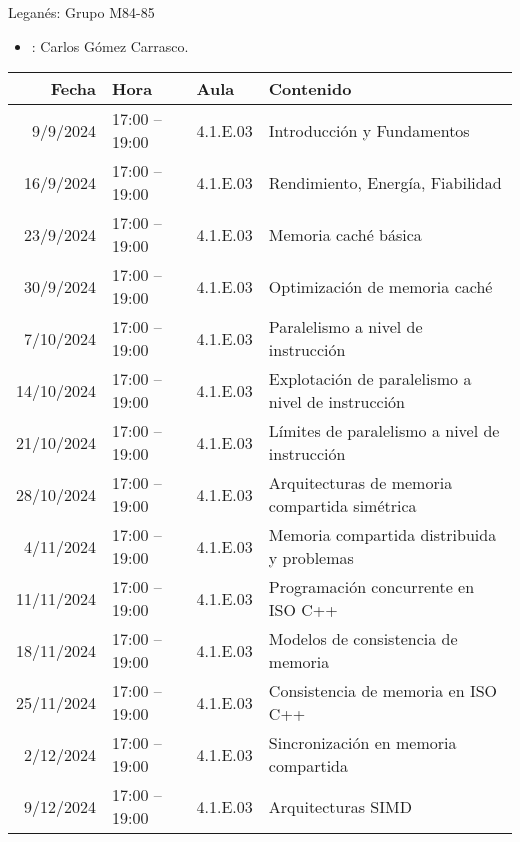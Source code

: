\begin{frame}[t,plain,shrink=20]{Leganés: Grupo M84-85}
\begin{itemize}
  \item {}: Carlos Gómez Carrasco.
\end{itemize}
\vspace{2em}
\begin{tabular}{|r|l|l|l|}
\hline
Fecha & Hora & Aula & Contenido\\
\hline\hline

9/9/2024 & 17:00 -- 19:00 & 4.1.E.03 & Introducción y Fundamentos\\
\hline
16/9/2024 & 17:00 -- 19:00 & 4.1.E.03 & Rendimiento, Energía, Fiabilidad\\
\hline
23/9/2024 & 17:00 -- 19:00 & 4.1.E.03 & Memoria caché básica\\
\hline
30/9/2024 & 17:00 -- 19:00 & 4.1.E.03 & Optimización de memoria caché\\
\hline
7/10/2024 & 17:00 -- 19:00 & 4.1.E.03 & Paralelismo a nivel de instrucción\\
\hline
14/10/2024 & 17:00 -- 19:00 & 4.1.E.03 & Explotación de paralelismo a nivel de instrucción\\
\hline
21/10/2024 & 17:00 -- 19:00 & 4.1.E.03 & Límites de paralelismo a nivel de instrucción\\
\hline
28/10/2024 & 17:00 -- 19:00 & 4.1.E.03 & Arquitecturas de memoria compartida simétrica\\
\hline
4/11/2024 & 17:00 -- 19:00 & 4.1.E.03 & Memoria compartida distribuida y problemas\\
\hline
11/11/2024 & 17:00 -- 19:00 & 4.1.E.03 & Programación concurrente en ISO C++\\
\hline
18/11/2024 & 17:00 -- 19:00 & 4.1.E.03 & Modelos de consistencia de memoria\\
\hline
25/11/2024 & 17:00 -- 19:00 & 4.1.E.03 & Consistencia de memoria en ISO C++\\
\hline
2/12/2024 & 17:00 -- 19:00 & 4.1.E.03 & Sincronización en memoria compartida\\
\hline
9/12/2024 & 17:00 -- 19:00 & 4.1.E.03 & Arquitecturas SIMD\\
\hline

\end{tabular}
\end{frame}


